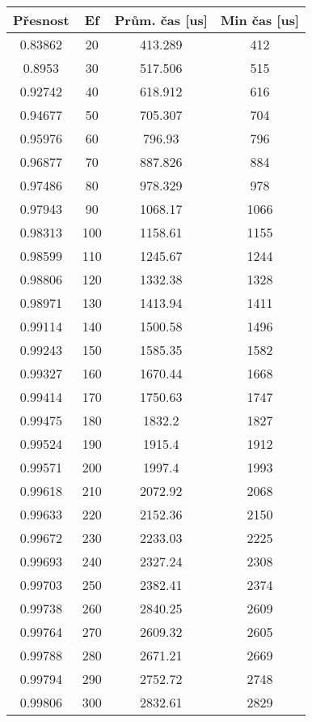 \documentclass[czech,semestral,dept460,male,csharp,cpdeclaration]{diploma}
\begin{document}
		\newpage
		\begin{center}
			\newpage
			\begin{tabular}{c c c c}\label{HNSWM}
				
				Přesnost & Ef & Prům. čas [us] & Min čas [us] \\
				\midrule
				0.83862 & 20 & 413.289 & 412 \\
				0.8953 & 30 & 517.506 & 515 \\
				0.92742 & 40 & 618.912 & 616 \\
				0.94677 & 50 & 705.307 & 704 \\
				0.95976 & 60 & 796.93 & 796 \\
				0.96877 & 70 & 887.826 & 884 \\
				0.97486 & 80 & 978.329 & 978 \\
				0.97943 & 90 & 1068.17 & 1066 \\
				0.98313 & 100 & 1158.61 & 1155 \\
				0.98599 & 110 & 1245.67 & 1244 \\
				0.98806 & 120 & 1332.38 & 1328 \\
				0.98971 & 130 & 1413.94 & 1411 \\
				0.99114 & 140 & 1500.58 & 1496 \\
				0.99243 & 150 & 1585.35 & 1582 \\
				0.99327 & 160 & 1670.44 & 1668 \\
				0.99414 & 170 & 1750.63 & 1747 \\
				0.99475 & 180 & 1832.2 & 1827 \\
				0.99524 & 190 & 1915.4 & 1912 \\
				0.99571 & 200 & 1997.4 & 1993 \\
				0.99618 & 210 & 2072.92 & 2068 \\
				0.99633 & 220 & 2152.36 & 2150 \\
				0.99672 & 230 & 2233.03 & 2225 \\
				0.99693 & 240 & 2327.24 & 2308 \\
				0.99703 & 250 & 2382.41 & 2374 \\
				0.99738 & 260 & 2840.25 & 2609 \\
				0.99764 & 270 & 2609.32 & 2605 \\
				0.99788 & 280 & 2671.21 & 2669 \\
				0.99794 & 290 & 2752.72 & 2748 \\
				0.99806 & 300 & 2832.61 & 2829 \\
			\end{tabular}
		
		\end{center}
		
\end{document}
